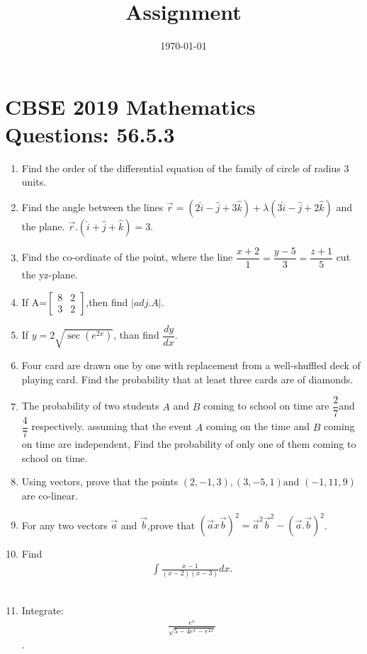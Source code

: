 \documentclass[12pt,-letter paper]{article}
\title{Assignment}
\date{\today}
\providecommand{\myvec}[1]{\ensuremath{\begin{bmatrix}#1\end{bmatrix}}}
\providecommand{\brak}[1]{\ensuremath{\left(#1\right)}}
\providecommand{\abs}[1]{\left\vert#1\right\vert}
\begin{document}
\maketitle
\section*{ CBSE 2019 Mathematics  Questions: 56.5.3 }
\begin{enumerate}
\item Find the  order of the differential equation of the family of circle of radius $3$ units.
\item Find the angle between the lines $\overrightarrow{r}=\brak{2\hat{i}-\hat{j}+3\hat{k}}+\lambda\brak{3\hat{i}-\hat{j}+2\hat{k}}$ and the plane. $\overrightarrow{r}.\brak{\hat{i}+\hat{j}+\hat{k}}=3$.
\item Find the co-ordinate of the point, where the line $ \dfrac{x+2}{1}=\dfrac{y-5}{3}=\dfrac{z+1}{5} $ cut the yz-plane.
\item If A=$\myvec{8&2\\3&2}$,then find $\abs{adj.A}$.
\item If $y=2\sqrt{\sec\brak{e^{2x}}}$, than find $\dfrac{dy}{dx}$.
\item Four card are drawn one by one with replacement from a well-shuffled deck of playing card. Find the probability that at least three cards are of diamonds.
\item The probability of two students $A$ and $B$ coming to school on time are $\dfrac{2}{7}$and $\dfrac{4}{7}$ respectively. assuming that the event $A$ coming on the time and $B$ coming on time are independent, Find the probability of only one of them coming to school on time.
\item Using vectors, prove that the points  $\brak{2,-1,3},\brak{3,-5,1}$and $\brak{-1,11,9}$ are co-linear.
\item For any two vectors $\overrightarrow{a}$ and $ \overrightarrow{b}$,prove that $\brak{\overrightarrow{a}x\overrightarrow{b}}^2=\overrightarrow{a}^2\overrightarrow{b}^2-\brak{\overrightarrow{a}.\overrightarrow{b}}^2$.
\item Find \begin{align*}
 \int \frac{x-1}{\brak{x-2}\brak{x-3}}dx.\end{align*}\\
\item Integrate:
\begin{align*}
\frac{e^x}{\sqrt{5-4e^x-e^{2x}}}
\end{align*}.

\end{enumerate}
\end{document}
